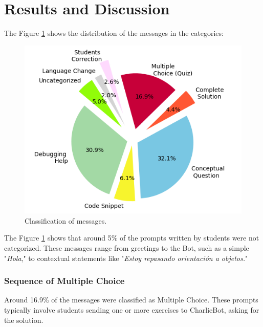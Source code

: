 \documentclass[a4paper,twoside]{article}
\begin{document}
\section{Results and Discussion}

The Figure \ref{fig:graph1} shows the distribution of the messages in the
categories:

\begin{figure}[h!]
    \centering
    \includegraphics[scale=0.6]{img/figure1.png}
    \caption{Classification of messages.}
    \label{fig:graph1}
\end{figure}



The Figure \ref{fig:graph1} shows that around 5\% of the prompts
written by students were not categorized. These messages range from
greetings to the Bot, such as a simple "\textit{Hola}," to
contextual statements like "\textit{Estoy repasando orientación a
objetos.}"

\subsubsection*{Sequence of Multiple Choice}

Around 16.9\% of the messages were classified as Multiple Choice. These prompts
typically involve students sending one or more exercises to CharlieBot, asking
for the solution.
\end{document}
